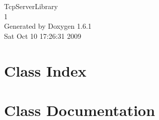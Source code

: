 \documentclass[a4paper]{book}
\begin{document}
\hypersetup{pageanchor=false}
\begin{titlepage}
\vspace*{7cm}
\begin{center}
{\Large TcpServerLibrary \\[1ex]\large 1 }\\
\vspace*{1cm}
{\large Generated by Doxygen 1.6.1}\\
\vspace*{0.5cm}
{\small Sat Oct 10 17:26:31 2009}\\
\end{center}
\end{titlepage}
\clearemptydoublepage
{}
\tableofcontents
\clearemptydoublepage
{}
\hypersetup{pageanchor=true}
\chapter{Class Index}

\chapter{Class Documentation}






\printindex
\end{document}
